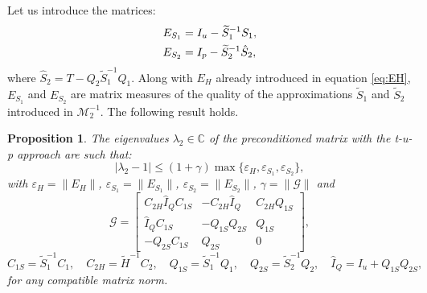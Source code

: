 \documentclass[3p,times]{elsarticle}
\theoremstyle{plain}
\newtheorem{prop}[thm]{Proposition}
\newcommand{\tS}{\widetilde{S}}
\newcommand{\tH}{\widetilde{H}}
\begin{document}
Let us introduce the matrices:
\begin{subequations}
\begin{align}
    E_{S_1} &= I_u - \tS_1^{-1} S_1, \label{eq:ES1} \\
    E_{S_2} &= I_p - \tS_2^{-1} \hat{S}_2, \label{eq:ES2}
\end{align}
\label{eq:E2def}\null
\end{subequations}
where $\hat{S}_2=T-Q_2\tS_1^{-1}Q_1$. Along with $E_H$ already introduced in equation \eqref{eq:EH}, $E_{S_1}$ and $E_{S_2}$ are matrix measures of the quality of the approximations $\tS_1$ and $\tS_2$ introduced in $\mathcal{M}_2^{-1}$. The following result holds.

\begin{prop}
\label{thm:eig_tup}
The eigenvalues $\lambda_2\in\mathbb{C}$ of the preconditioned matrix with the t-u-p approach are such that:
\begin{equation}
    |\lambda_2-1| \leq (1+\gamma) \max\{\varepsilon_H,\varepsilon_{S_1}, \varepsilon_{S_2}\},
    \label{eq:eigbound2}
\end{equation}
with $\varepsilon_H=\|E_H\|$, $\varepsilon_{S_1}=\|E_{S_1}\|$, $\varepsilon_{S_2}=\|E_{S_2}\|$, $\gamma=\|\mathcal{G}\|$ and
\begin{equation}
    \mathcal{G} = \left[ \begin{array}{ccc}
    C_{2H}\hat{I}_QC_{1S} & -C_{2H}\hat{I}_Q & C_{2H}Q_{1S} \\
    \hat{I}_QC_{1S} & -Q_{1S}Q_{2S} & Q_{1S} \\
    -Q_{2S}C_{1S} & Q_{2S} & 0 \end{array} \right], 
    \label{eq:Gdef}
\end{equation}
\begin{equation}
    C_{1S} = \tS_1^{-1}C_1, \quad C_{2H} = \tH^{-1}C_2, \quad Q_{1S} = \tS_1^{-1}Q_1, \quad Q_{2S} = \tS_2^{-1}Q_2, \quad \hat{I}_Q = I_u + Q_{1S}Q_{2S},
    \label{eq:matdef}
\end{equation}
for any compatible matrix norm.
\end{prop}
\end{document}
